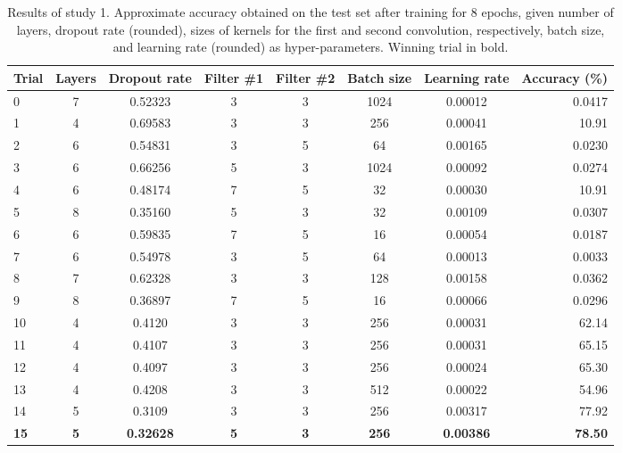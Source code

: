\documentclass[british,12p]{article}
\begin{document}
    \begin{table}[h!]
    \begin{center}
    \begin{tabular}{l||c|c|c|c|c|c||r}
  		Trial & Layers & Dropout rate & Filter \#1 & Filter \#2 & Batch size & Learning rate & Accuracy (\%) \\
  		\hline\hline
  		0 & 7 & 0.52323 & 3 & 3 & 1024 & 0.00012 & 0.0417\\\hline
  		1 & 4 & 0.69583 & 3 & 3 & 256 & 0.00041 & 10.91\\\hline
  		2 & 6 & 0.54831 & 3 & 5 & 64 & 0.00165 & 0.0230\\\hline
  		3 & 6 & 0.66256 & 5 & 3 & 1024 & 0.00092 & 0.0274\\\hline
  		4 & 6 & 0.48174 & 7 & 5 & 32 & 0.00030 & 10.91\\\hline
  		5 & 8 & 0.35160 & 5 & 3 & 32 & 0.00109 & 0.0307\\\hline
  		6 & 6 & 0.59835 & 7 & 5 & 16 & 0.00054 & 0.0187\\\hline
  		7 & 6 & 0.54978 & 3 & 5 & 64 & 0.00013 & 0.0033\\\hline
  		8 & 7 & 0.62328 & 3 & 3 & 128 & 0.00158 & 0.0362\\\hline
  		9 & 8 & 0.36897 & 7 & 5 & 16 & 0.00066 & 0.0296\\\hline
  		10 & 4 & 0.4120 & 3 & 3 & 256 & 0.00031& 62.14\\\hline
  		11 & 4 & 0.4107 & 3 & 3 & 256 & 0.00031 & 65.15\\\hline
  		12 & 4 & 0.4097 & 3 & 3 & 256 & 0.00024& 65.30\\\hline
  		13 & 4 & 0.4208 & 3 & 3 & 512 & 0.00022 & 54.96\\\hline
  		14 & 5 & 0.3109 & 3 & 3 & 256 & 0.00317& 77.92 \\\hline
  		\textbf{15} & \textbf{5} & \textbf{0.32628} & \textbf{5} & \textbf{3} & \textbf{256} & \textbf{0.00386} & \textbf{78.50}
  		 
	\end{tabular}
	\caption{Results of study 1. Approximate accuracy obtained on the test set after training for 8 epochs, given number of layers, dropout rate (rounded), sizes of kernels for the first and second convolution, respectively, batch size, and learning rate (rounded) as hyper-parameters. Winning trial in bold.}
	\label{tab-res1}
	\end{center}
	 \end{table}
	 
\end{document}
